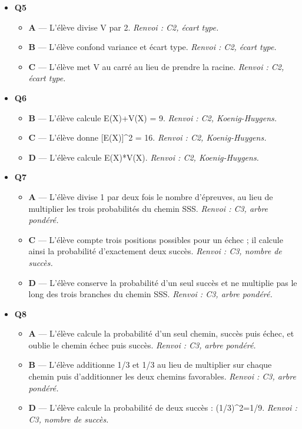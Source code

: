 \begin{itemize}
\begin{itemize}
  \end{itemize}
  \item \textbf{Q5}
  \begin{itemize}
    \item \textbf{A} — L'élève divise V par 2. \emph{Renvoi : C2, écart type.}
    \item \textbf{B} — L'élève confond variance et écart type. \emph{Renvoi : C2, écart type.}
    \item \textbf{C} — L'élève met V au carré au lieu de prendre la racine. \emph{Renvoi : C2, écart type.}
  \end{itemize}
  \item \textbf{Q6}
  \begin{itemize}
    \item \textbf{B} — L'élève calcule E(X)+V(X) = 9. \emph{Renvoi : C2, Koenig-Huygens.}
    \item \textbf{C} — L'élève donne [E(X)]\textasciicircum{}2 = 16. \emph{Renvoi : C2, Koenig-Huygens.}
    \item \textbf{D} — L'élève calcule E(X)*V(X). \emph{Renvoi : C2, Koenig-Huygens.}
  \end{itemize}
  \item \textbf{Q7}
  \begin{itemize}
    \item \textbf{A} — L'élève divise 1 par deux fois le nombre d'épreuves, au lieu de multiplier les trois probabilités du chemin SSS. \emph{Renvoi : C3, arbre pondéré.}
    \item \textbf{C} — L'élève compte trois positions possibles pour un échec ; il calcule ainsi la probabilité d'exactement deux succès. \emph{Renvoi : C3, nombre de succès.}
    \item \textbf{D} — L'élève conserve la probabilité d'un seul succès et ne multiplie pas le long des trois branches du chemin SSS. \emph{Renvoi : C3, arbre pondéré.}
  \end{itemize}
  \item \textbf{Q8}
  \begin{itemize}
    \item \textbf{A} — L'élève calcule la probabilité d'un seul chemin, succès puis échec, et oublie le chemin échec puis succès. \emph{Renvoi : C3, arbre pondéré.}
    \item \textbf{B} — L'élève additionne 1/3 et 1/3 au lieu de multiplier sur chaque chemin puis d'additionner les deux chemins favorables. \emph{Renvoi : C3, arbre pondéré.}
    \item \textbf{D} — L'élève calcule la probabilité de deux succès : (1/3)\textasciicircum{}2=1/9. \emph{Renvoi : C3, nombre de succès.}

\end{itemize}
\end{itemize}
